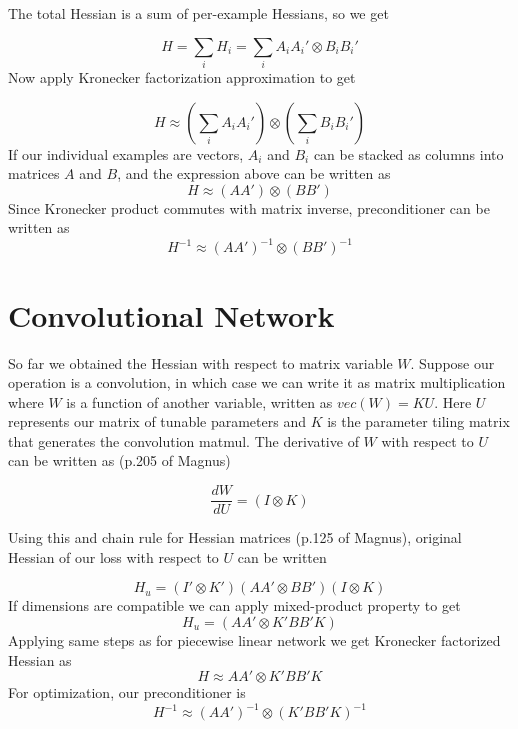 \documentclass{article}
\begin{document}
The total Hessian is a sum of per-example Hessians, so we get

$$H = \sum_i H_i = \sum_i A_iA_i'\otimes B_iB_i'$$
Now apply Kronecker factorization approximation to get

$$H \approx \left(\sum_i A_iA_i'\right)\otimes \left(\sum_iB_iB_i'\right)$$
If our individual examples are vectors, $A_i$ and $B_i$ can be stacked as columns into matrices $A$ and $B$, and the expression above can be written as
$$H \approx \left(AA'\right)\otimes \left(BB'\right)$$
Since Kronecker product commutes with matrix inverse, preconditioner can be written as
$$H^{-1}\approx \left(AA'\right)^{-1}\otimes \left(BB'\right)^{-1}$$

\section*{Convolutional Network}
So far we obtained the Hessian with respect to matrix variable $W$. Suppose our operation is a convolution, in which case we can write it as matrix multiplication where $W$ is a function of another variable, written as $vec(W)=KU$. Here $U$ represents our matrix of tunable parameters and $K$ is the parameter tiling matrix that generates the convolution matmul. The derivative of $W$ with respect to $U$ can be written as (p.205 of Magnus)

$$\frac{dW}{dU} = (I\otimes K)$$

Using this and chain rule for Hessian matrices (p.125 of Magnus), original Hessian of our loss with respect to $U$ can be written 

$$H_u=(I'\otimes K')(AA'\otimes BB')(I\otimes K)$$
If dimensions are compatible we can apply mixed-product property to get
$$H_u=(AA'\otimes K'BB'K)$$
Applying same steps as for piecewise linear network we get Kronecker factorized Hessian as
$$H\approx AA' \otimes K'BB'K$$
For optimization, our preconditioner is
$$H^{-1}\approx \left(AA'\right)^{-1} \otimes \left(K'BB'K\right)^{-1}$$
\end{document}
